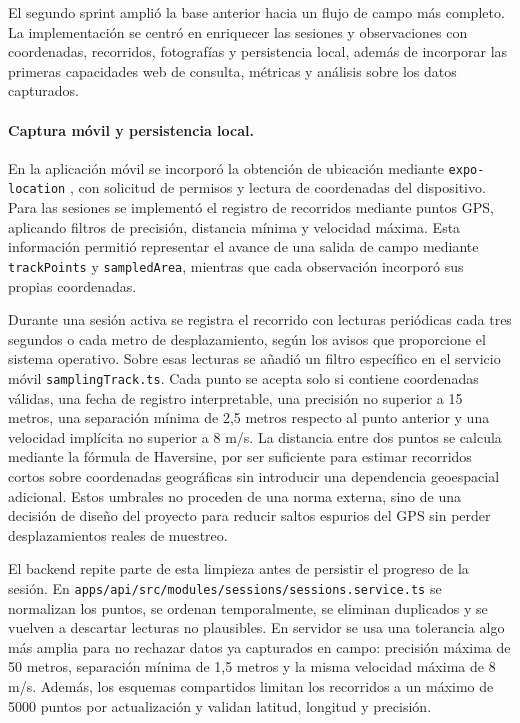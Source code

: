 El segundo sprint amplió la base anterior hacia un flujo de campo más completo.
La implementación se centró en enriquecer las sesiones y observaciones con
coordenadas, recorridos, fotografías y persistencia local, además de incorporar
las primeras capacidades web de consulta, métricas y análisis sobre los datos
capturados.

\paragraph{Captura móvil y persistencia local.}
En la aplicación móvil se incorporó la obtención de ubicación mediante
\texttt{expo-location} \cite{expo-location}, con solicitud de permisos y lectura de coordenadas del
dispositivo. Para las sesiones se implementó el registro de recorridos mediante
puntos GPS, aplicando filtros de precisión, distancia mínima y velocidad máxima.
Esta información permitió representar el avance de una salida de campo mediante
\texttt{trackPoints} y \texttt{sampledArea}, mientras que cada observación
incorporó sus propias coordenadas.

Durante una sesión activa se registra el recorrido con
lecturas periódicas cada tres segundos o cada metro de desplazamiento, según
los avisos que proporcione el sistema operativo. Sobre esas lecturas se añadió un filtro específico en el servicio móvil
\texttt{samplingTrack.ts}. Cada punto se acepta solo si contiene coordenadas
válidas, una fecha de registro interpretable, una precisión no superior a 15
metros, una separación mínima de 2,5 metros respecto al punto anterior y una
velocidad implícita no superior a 8 m/s. La distancia entre dos puntos se
calcula mediante la fórmula de Haversine, por ser
suficiente para estimar recorridos cortos sobre coordenadas geográficas sin
introducir una dependencia geoespacial adicional. Estos umbrales no proceden de
una norma externa, sino de una decisión de diseño del proyecto para reducir
saltos espurios del GPS sin perder desplazamientos reales de muestreo.

El backend repite parte de esta limpieza antes de persistir el progreso de la
sesión. En \texttt{apps/api/src/modules/sessions/sessions.service.ts} se
normalizan los puntos, se ordenan temporalmente, se eliminan duplicados y se
vuelven a descartar lecturas no plausibles. En servidor se usa una tolerancia
algo más amplia para no rechazar datos ya capturados en campo: precisión máxima
de 50 metros, separación mínima de 1,5 metros y la misma velocidad máxima de
8 m/s. Además, los esquemas compartidos limitan los recorridos a un máximo de
5000 puntos por actualización y validan latitud, longitud y precisión.

